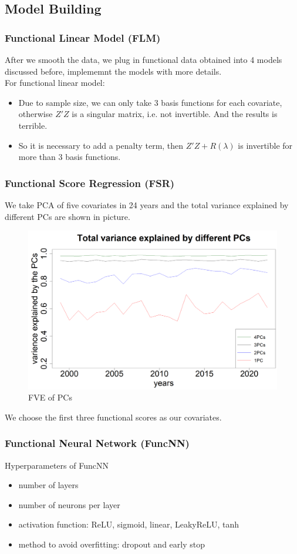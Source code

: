\documentclass[
	9pt, %
]{beamer}
\begin{document}
\subsection{Model Building}
\begin{frame}
	\frametitle{Functional Linear Model (FLM)}
	After we smooth the data, we plug in functional data obtained into 4 models discussed before, implememnt the models with more details.
	\bigskip \\
	For functional linear model:
	\begin{itemize}
	\item Due to sample size, we can only take 3 basis functions for each covariate, otherwise $Z'Z$ is a singular matrix, i.e. not invertible. And the results is terrible.
	\bigskip
	\item So it is necessary to add a penalty term, then $Z'Z+R(\lambda)$ is invertible for more than 3 basis functions.
	\end{itemize}
\end{frame}
\begin{frame}
	\frametitle{Functional Score Regression (FSR)}
	We take PCA of five covariates in 24 years and the total variance explained by different PCs are shown in picture.
	\begin{figure}
	\includegraphics[width=0.65\linewidth]{3PCs.png}
	\caption{FVE of PCs}
	\end{figure}
	We choose the first three functional scores as our covariates.
\end{frame}
\begin{frame}
	\frametitle{Functional Neural Network (FuncNN)}
	Hyperparameters of FuncNN
	\begin{itemize}
	\item number of layers 
	\item number of neurons per layer 
	\item activation function: ReLU, sigmoid, linear, LeakyReLU, tanh
	\item method to avoid overfitting: dropout and early stop
	\end{itemize}
\end{frame}
\end{document}

